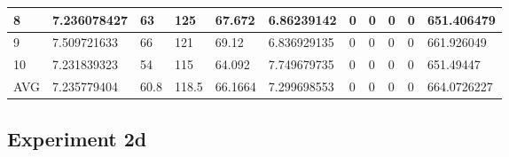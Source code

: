 \begin{table}[H]
\begin{adjustbox}{max width=380pt,keepaspectratio,angle=90}
\begin{tabular}{|l|l|l|l|l|l|l|l|l|l|l|}
						8          & 7.236078427 & 63         & 125        & 67.672     & 6.86239142  & 0           & 0           & 0           & 0           & 651.406479  \\ \hline
						9          & 7.509721633 & 66         & 121        & 69.12      & 6.836929135 & 0           & 0           & 0           & 0           & 661.926049  \\ \hline
						10         & 7.231839323 & 54         & 115        & 64.092     & 7.749679735 & 0           & 0           & 0           & 0           & 651.49447   \\ \hline\hline
						AVG        & 7.235779404 & 60.8       & 118.5      & 66.1664    & 7.299698553 & 0           & 0           & 0           & 0           & 664.0726227 \\ \hline
					\end{tabular}
				\end{adjustbox}	
			\end{table}

	\subsection{Experiment 2d}
	\label{sec:A_Exp2d}
